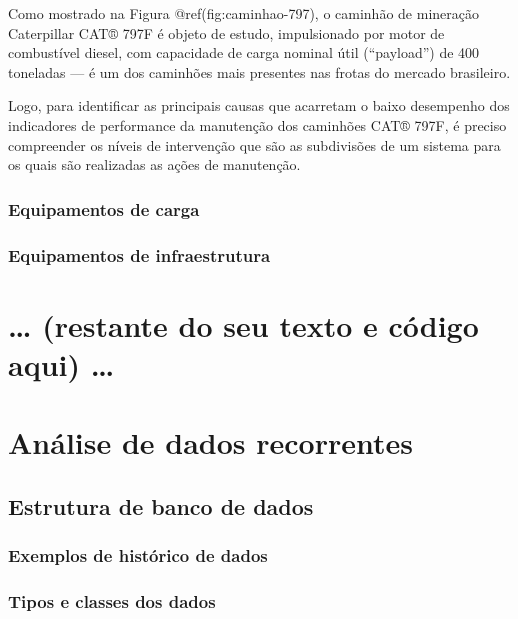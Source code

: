 \documentclass[
  letterpaper,
]{book}
\begin{document}
Como mostrado na Figura @ref(fig:caminhao-797), o caminhão de mineração
Caterpillar CAT® 797F é objeto de estudo, impulsionado por motor de
combustível diesel, com capacidade de carga nominal útil (``payload'')
de 400 toneladas --- é um dos caminhões mais presentes nas frotas do
mercado brasileiro.

Logo, para identificar as principais causas que acarretam o baixo
desempenho dos indicadores de performance da manutenção dos caminhões
CAT® 797F, é preciso compreender os níveis de intervenção que são as
subdivisões de um sistema para os quais são realizadas as ações de
manutenção.

\subsection{Equipamentos de carga}\label{equipamentos-de-carga}

\subsection{Equipamentos de
infraestrutura}\label{equipamentos-de-infraestrutura}

\chapter{\ldots{} (restante do seu texto e código aqui)
\ldots{}}\label{restante-do-seu-texto-e-cuxf3digo-aqui}

\chapter{Análise de dados
recorrentes}\label{anuxe1lise-de-dados-recorrentes}

\section{Estrutura de banco de dados}\label{estrutura-de-banco-de-dados}

\subsection{Exemplos de histórico de
dados}\label{exemplos-de-histuxf3rico-de-dados}

\subsection{Tipos e classes dos dados}\label{tipos-e-classes-dos-dados}
\end{document}
